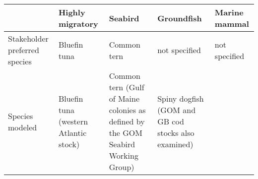 \documentclass[]{article}
\begin{document}
\begin{longtable}[]{@{}lllll@{}}
\toprule
\begin{minipage}[b]{0.17\columnwidth}\raggedright\strut
\strut
\end{minipage} & \begin{minipage}[b]{0.17\columnwidth}\raggedright\strut
Highly migratory\strut
\end{minipage} & \begin{minipage}[b]{0.17\columnwidth}\raggedright\strut
Seabird\strut
\end{minipage} & \begin{minipage}[b]{0.17\columnwidth}\raggedright\strut
Groundfish\strut
\end{minipage} & \begin{minipage}[b]{0.17\columnwidth}\raggedright\strut
Marine mammal\strut
\end{minipage}\tabularnewline
\midrule
\endhead
\begin{minipage}[t]{0.17\columnwidth}\raggedright\strut
Stakeholder preferred species\strut
\end{minipage} & \begin{minipage}[t]{0.17\columnwidth}\raggedright\strut
Bluefin tuna\strut
\end{minipage} & \begin{minipage}[t]{0.17\columnwidth}\raggedright\strut
Common tern\strut
\end{minipage} & \begin{minipage}[t]{0.17\columnwidth}\raggedright\strut
not specified\strut
\end{minipage} & \begin{minipage}[t]{0.17\columnwidth}\raggedright\strut
not specified\strut
\end{minipage}\tabularnewline
\begin{minipage}[t]{0.17\columnwidth}\raggedright\strut
Species modeled\strut
\end{minipage} & \begin{minipage}[t]{0.17\columnwidth}\raggedright\strut
Bluefin tuna (western Atlantic stock)\strut
\end{minipage} & \begin{minipage}[t]{0.17\columnwidth}\raggedright\strut
Common tern (Gulf of Maine colonies as defined by the GOM Seabird
Working Group)\strut
\end{minipage} & \begin{minipage}[t]{0.17\columnwidth}\raggedright\strut
Spiny dogfish (GOM and GB cod stocks also examined)\strut

\end{minipage}
\end{longtable}
\end{document}
